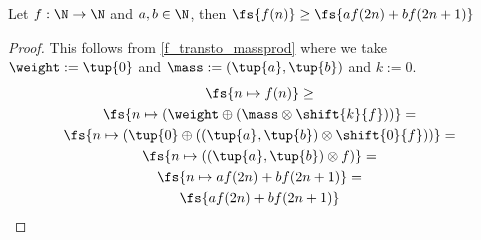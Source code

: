 \begin{corollary}\label{f_ineq_v}
	Let $f: \N \to \N$ and $a,b\in\N$, then 
	$\fs{f(n)} \geq \fs{af(2n) + bf(2n+1)}$
	\begin{proof}
		This follows from \cref{f_transto_massprod} where we take $\weight := \tup{0}$ and $\mass := (\tup{a},\tup{b})$ and $k := 0$. 
		\begin{gather*}
			\fs{n \mapsto f(n)} \geq \\
			\fs{n \mapsto (\weight \oplus (\mass \otimes \shift{k}{f}))} = \\
			\fs{n \mapsto (\tup{0} \oplus ((\tup{a},\tup{b}) \otimes \shift{0}{f}))} = \\
			\fs{n \mapsto ((\tup{a},\tup{b}) \otimes f)} = \\
			\fs{n \mapsto af(2n) + bf(2n+1)} = \\
			\fs{af(2n) + bf(2n+1)}
		\end{gather*}
	\end{proof}
\end{corollary}


